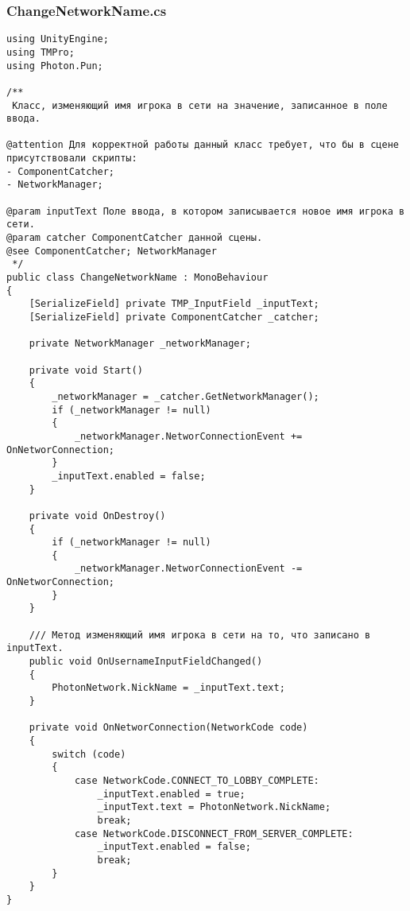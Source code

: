 \subsubsection*{ChangeNetworkName.cs}
\begin{verbatim}
﻿using UnityEngine;
using TMPro;
using Photon.Pun;

/**
 Класс, изменяющий имя игрока в сети на значение, записанное в поле ввода.

@attention Для корректной работы данный класс требует, что бы в сцене присутствовали скрипты:
- ComponentCatcher;
- NetworkManager;

@param inputText Поле ввода, в котором записывается новое имя игрока в сети.
@param catcher ComponentCatcher данной сцены.
@see ComponentCatcher; NetworkManager
 */
public class ChangeNetworkName : MonoBehaviour
{
    [SerializeField] private TMP_InputField _inputText;
    [SerializeField] private ComponentCatcher _catcher;

    private NetworkManager _networkManager;

    private void Start()
    {
        _networkManager = _catcher.GetNetworkManager();
        if (_networkManager != null)
        {
            _networkManager.NetworConnectionEvent += OnNetworConnection;
        }
        _inputText.enabled = false;
    }

    private void OnDestroy()
    {
        if (_networkManager != null)
        {
            _networkManager.NetworConnectionEvent -= OnNetworConnection;
        }
    }

    /// Метод изменяющий имя игрока в сети на то, что записано в inputText.
    public void OnUsernameInputFieldChanged()
    {
        PhotonNetwork.NickName = _inputText.text;
    }

    private void OnNetworConnection(NetworkCode code)
    {
        switch (code)
        {
            case NetworkCode.CONNECT_TO_LOBBY_COMPLETE:
                _inputText.enabled = true;
                _inputText.text = PhotonNetwork.NickName;
                break;
            case NetworkCode.DISCONNECT_FROM_SERVER_COMPLETE:
                _inputText.enabled = false;                
                break;
        }
    }
}

\end{verbatim}
